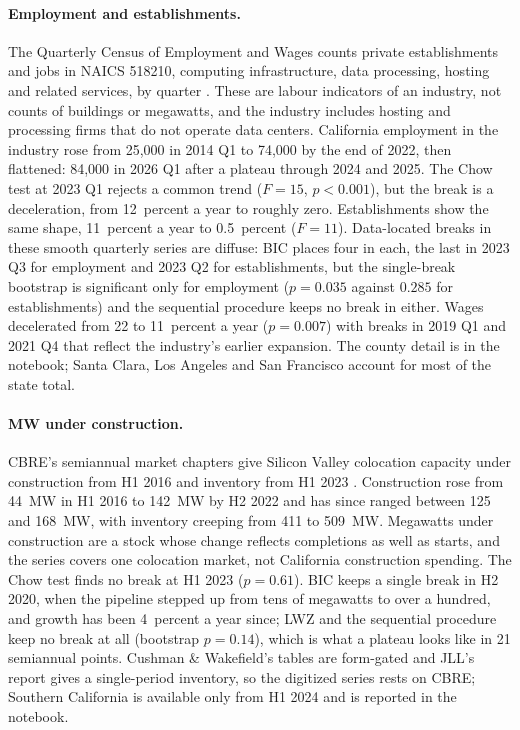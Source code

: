 \paragraph{Employment and establishments.} The Quarterly Census of Employment and Wages counts private establishments and jobs in NAICS 518210, computing infrastructure, data processing, hosting and related services, by quarter \citep{qcew}. These are labour indicators of an industry, not counts of buildings or megawatts, and the industry includes hosting and processing firms that do not operate data centers. California employment in the industry rose from 25,000 in 2014 Q1 to 74,000 by the end of 2022, then flattened: 84,000 in 2026 Q1 after a plateau through 2024 and 2025. The Chow test at 2023 Q1 rejects a common trend ($F = 15$, $p < 0.001$), but the break is a deceleration, from 12~percent a year to roughly zero. Establishments show the same shape, 11~percent a year to 0.5~percent ($F = 11$). Data-located breaks in these smooth quarterly series are diffuse: BIC places four in each, the last in 2023 Q3 for employment and 2023 Q2 for establishments, but the single-break bootstrap is significant only for employment ($p = 0.035$ against $0.285$ for establishments) and the sequential procedure keeps no break in either. Wages decelerated from 22 to 11~percent a year ($p = 0.007$) with breaks in 2019 Q1 and 2021 Q4 that reflect the industry's earlier expansion. The county detail is in the notebook; Santa Clara, Los Angeles and San Francisco account for most of the state total.

\paragraph{MW under construction.} CBRE's semiannual market chapters give Silicon Valley colocation capacity under construction from H1 2016 and inventory from H1 2023 \citep{cbre_series}. Construction rose from 44~MW in H1 2016 to 142~MW by H2 2022 and has since ranged between 125 and 168~MW, with inventory creeping from 411 to 509~MW. Megawatts under construction are a stock whose change reflects completions as well as starts, and the series covers one colocation market, not California construction spending. The Chow test finds no break at H1 2023 ($p = 0.61$). BIC keeps a single break in H2 2020, when the pipeline stepped up from tens of megawatts to over a hundred, and growth has been 4~percent a year since; LWZ and the sequential procedure keep no break at all (bootstrap $p = 0.14$), which is what a plateau looks like in 21 semiannual points. Cushman \& Wakefield's tables are form-gated and JLL's report gives a single-period inventory, so the digitized series rests on CBRE; Southern California is available only from H1 2024 and is reported in the notebook.

